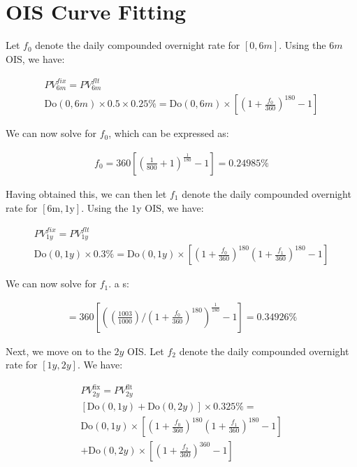 \documentclass[12pt]{article}
\begin{document}
\section*{OIS Curve Fitting}

Let $f_0$ denote the daily compounded overnight rate for $[0, 6m]$. Using the $6m$ OIS, we have:

\begin{gather*}
PV_{6m}^{fix} = PV_{6m}^{flt} \\
\text{Do}(0, 6m) \times 0.5 \times 0.25\% = \text{Do}(0, 6m) \times \left[\left(1 + \frac{f_0}{360}\right)^{180} - 1\right]
\end{gather*}

\noindent We can now solve for $f_0$, which can be expressed as:

\begin{gather*}
f_0 = 360 \left[\left(\frac{1}{800} +1\right)^\frac{1}{180}
-1\right]
= 0.24985\%
\end{gather*}

\noindent Having obtained this, we can then let $f_1$ denote the daily compounded overnight rate for $[6\text{m}, 1\text{y}]$. Using the $1\text{y}$ OIS, we have:

\begin{gather*}
PV_{1y}^{fix} = PV_{1y}^{flt} \\
\text{Do}(0, 1y) \times 0.3\% = \text{Do}(0, 1y) \times\left[
\left(1 + \frac{f_0}{360}\right)^{180} \left(1 + \frac{f_1}{360}\right)^{180} - 1\right]
\end{gather*}

\noindent We can now solve for $f_1$. a s:

\begin{gather*}
 = 360 \left[\left(\left(\frac{1003}{1000}\right) /\left( 1+\frac{f_0}{360}
\right)^{180}\right)^{\frac{1}{180}} -1\right]
= 0.34926\%
\end{gather*}


\noindent Next, we move on to the $2y$ OIS. Let $f_2$ denote the daily compounded overnight rate for $[1y, 2y]$. We have:

\begin{gather*}
PV_{2y}^{\text{fix}} = PV_{2y}^{\text{flt}} \\
\left[\text{Do}(0, 1y) + \text{Do}(0, 2y)\right] \times 0.325\% = \\
\text{Do}(0, 1y) \times \left[\left(1 + \frac{f_0}{360}\right)^{180} \left(1 + \frac{f_1}{360}\right)^{180} - 1\right]\\
+ \text{Do}(0, 2y) \times \left[\left(1 + \frac{f_2}{360}\right)^{360} - 1\right]
\end{gather*}
\end{document}
